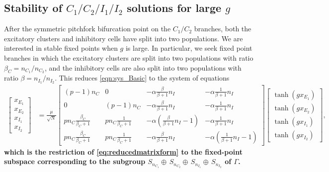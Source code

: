 \documentclass[reqno]{siamonline190516}
\newcommand{\revised}[1]{ \textbf{#1} }
\begin{document}
\subsection{Stability of \texorpdfstring{$C_1/C_2/I_1/I_2$}{C1/C2/I1/I2} solutions for large \texorpdfstring{$g$}{g}}\label{sec:C1C2I1I2_largeg}

After the symmetric pitchfork bifurcation point on the $C_1/C_2$ branches, both the excitatory clusters and inhibitory cells have split into two populations. We are interested in stable fixed points when $g$ is large. In particular, we seek fixed point branches in which the excitatory clusters are split into two populations with ratio $\beta_C = n_{C_1}/n_{C_2}$, and the inhibitory cells are also split into two populations with ratio $\beta = n_{I_1}/n_{I_2}$. This reduces \cref{eqn:sys_Basic} to the system of equations
\begin{equation}\label{eq:cluster4system}
    \begin{aligned}
    \begin{bmatrix} x_{E_1} \\ x_{E_2} \\ x_{I_1} \\ x_{I_2} \end{bmatrix} 
    &= \frac{\mu}{\sqrt{N}} 
    \begin{bmatrix} 
       (p-1)n_C & 0 & -\alpha \frac{\beta}{\beta+1}n_I &  -\alpha \frac{1}{\beta+1}n_I \\
       0  & (p-1)n_C & -\alpha \frac{\beta}{\beta+1}n_I &  -\alpha \frac{1}{\beta+1}n_I \\
       p n_C \frac{\beta_C}{\beta_C+1} &
       p n_C \frac{1}{\beta_C+1} &
       -\alpha \left(\frac{\beta}{\beta+1}n_I-1\right) &  -\alpha \frac{1}{\beta+1}n_I \\
       p n_C \frac{\beta_C}{\beta_C+1} &
       p n_C \frac{1}{\beta_C+1} &
       -\alpha \frac{\beta}{\beta+1}n_I & -\alpha \left(\frac{1}{\beta+1}n_I - 1 \right)
    \end{bmatrix}
    \begin{bmatrix} \tanh(g x_{E_1}) \\ \tanh ( g x_{E_2} ) \\\tanh(g x_{I_1}) \\\tanh(g x_{I_2})  \end{bmatrix},
    \end{aligned}
\end{equation}
\revised{
which is the restriction of \cref{eq:reducedmatrixform} to the fixed-point subspace corresponding to the subgroup $S_{n_{C_1}} \oplus \, S_{n_{C_2}} \oplus \, S_{n_{I_1}} \oplus \, S_{n_{I_2}}$ of $\Gamma$.
}
\end{document}
